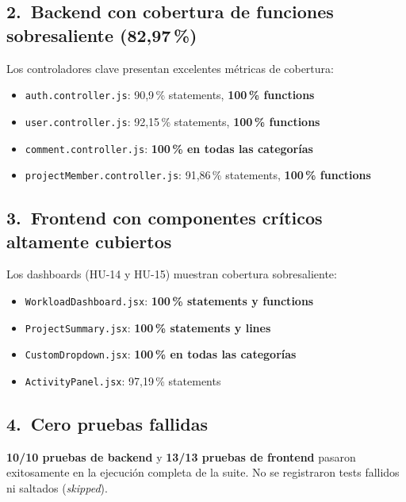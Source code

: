 \documentclass[12pt, a4paper]{article}
\begin{document}
\subsection{2.\ Backend con cobertura de funciones sobresaliente (82,97\,\%)}

\begin{logrobox}
Los controladores clave presentan excelentes métricas de cobertura:
\begin{itemize}[leftmargin=1.4em, topsep=2pt]
  \item \texttt{auth.controller.js}: 90,9\,\% statements, \textbf{100\,\% functions}
  \item \texttt{user.controller.js}: 92,15\,\% statements, \textbf{100\,\% functions}
  \item \texttt{comment.controller.js}: \textbf{100\,\% en todas las categorías}
  \item \texttt{projectMember.controller.js}: 91,86\,\% statements, \textbf{100\,\% functions}
\end{itemize}
\end{logrobox}

\subsection{3.\ Frontend con componentes críticos altamente cubiertos}

\begin{logrobox}
Los dashboards (HU-14 y HU-15) muestran cobertura sobresaliente:
\begin{itemize}[leftmargin=1.4em, topsep=2pt]
  \item \texttt{WorkloadDashboard.jsx}: \textbf{100\,\% statements y functions}
  \item \texttt{ProjectSummary.jsx}: \textbf{100\,\% statements y lines}
  \item \texttt{CustomDropdown.jsx}: \textbf{100\,\% en todas las categorías}
  \item \texttt{ActivityPanel.jsx}: 97,19\,\% statements
\end{itemize}
\end{logrobox}

\subsection{4.\ Cero pruebas fallidas}

\begin{logrobox}
\textbf{10/10 pruebas de backend} y \textbf{13/13 pruebas de frontend} pasaron
exitosamente en la ejecución completa de la suite. No se registraron tests fallidos
ni saltados (\textit{skipped}).
\end{logrobox}
\end{document}
